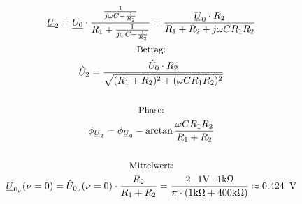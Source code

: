 \documentclass[a4paper, 12pt]{article}
\begin{document}
    \begin{gather*}
      \underline{U}_2 = \underline{U_0} \cdot \dfrac{ \frac{1}{ j \omega C + \frac{1}{R_2} }  }{ R_1 + \frac{1}{ j \omega C + \frac{1}{R_2} } } = \frac{\underline{U}_0 \cdot R_2}{R_1+R_2+ j \omega C R_1 R_2}\\
      \text{\small Betrag:}\\
      \hat{U}_2 = \frac{\hat{U}_0 \cdot R_2}{\sqrt{(R_1+R_2)^2 + (\omega C R_1 R_2)^2}}\\\\
      \text{\small Phase:}\\
      \phi_{\underline{U}_2} = \phi_{\underline{U}_0} - \arctan{ \frac{\omega C R_1 R_2}{R_1+R_2} }\\\\
      \text{\small Mittelwert:}\\
      \underline{U}_{0_\nu} (\nu = 0) = \hat{U}_{0_\nu}(\nu=0) \cdot \frac{R_2}{R_1+R_2} = \frac{2 \cdot 1 \si{\volt}\cdot 1\si{\kilo\ohm}}{\pi\cdot(1\si{\kilo\ohm}+400\si{\kilo\ohm})} \approx 0.424 \,\ \si{\volt}
    \end{gather*}
\end{document}
